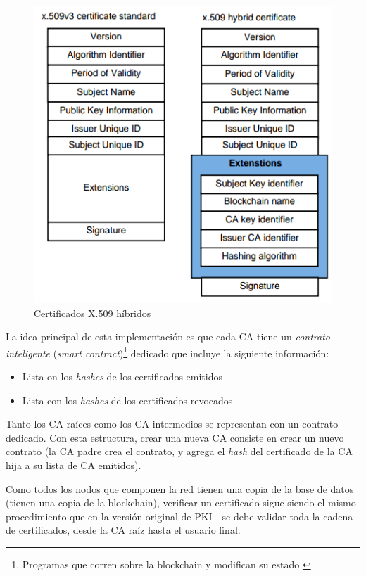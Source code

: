 \begin{figure}[H]
    \centering
    \includegraphics[width=0.8\linewidth]{images/blockchain-pki-certificates.png}
    \caption*{Certificados X.509 híbridos \autocite{BlockchainBasedPKIFramework}}
\end{figure}

La idea principal de esta implementación es que cada CA tiene un \emph{contrato inteligente} (\emph{smart contract})\footnote{Programas que corren sobre la blockchain y modifican su estado \autocite{SmartContracts}} dedicado que incluye la siguiente información:

\begin{itemize}
    \item Lista on los \emph{hashes} de los certificados emitidos
    \item Lista con los \emph{hashes} de los certificados revocados
\end{itemize}

Tanto los CA raíces como los CA intermedios se representan con un contrato dedicado. Con esta estructura, crear una nueva CA consiste en crear un nuevo contrato (la CA padre crea el contrato, y agrega el \emph{hash} del certificado de la CA hija a su lista de CA emitidos).

Como todos los nodos que componen la red tienen una copia de la base de datos (tienen una copia de la blockchain), verificar un certificado sigue siendo el mismo procedimiento que en la versión original de PKI - se debe validar toda la cadena de certificados, desde la CA raíz hasta el usuario final.


